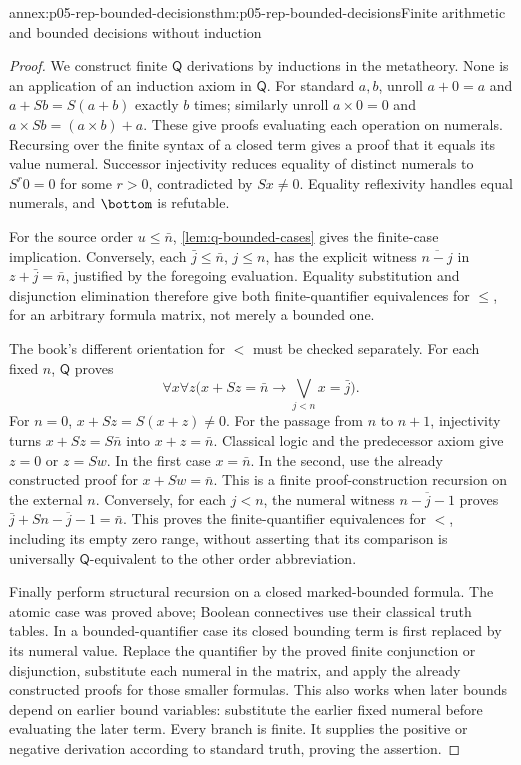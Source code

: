 \begin{annexitem}{annex:p05-rep-bounded-decisions}{thm:p05-rep-bounded-decisions}{Finite arithmetic and bounded decisions without induction}
\begin{proof}
We construct finite \(\mathsf Q\) derivations by inductions in the
metatheory. None is an application of an induction axiom in \(\mathsf Q\).
For standard \(a,b\), unroll \(a+0=a\) and
\(a+Sb=S(a+b)\) exactly \(b\) times; similarly unroll
\(a\times0=0\) and \(a\times Sb=(a\times b)+a\).
These give proofs evaluating each operation on numerals. Recursing over
the finite syntax of a closed term gives a proof that it equals its value
numeral. Successor injectivity reduces equality of distinct numerals to
\(S^r0=0\) for some \(r>0\), contradicted by \(Sx\ne0\).
Equality reflexivity handles equal numerals, and \(\bottom\) is refutable.

For the source order \(u\leq\bar n\),
\cref{lem:q-bounded-cases} gives the finite-case implication. Conversely,
each \(\bar j\leq\bar n\), \(j\leq n\), has the explicit witness
\(\overline{n-j}\) in \(z+\bar j=\bar n\), justified by the foregoing
evaluation. Equality substitution and disjunction elimination therefore
give both finite-quantifier equivalences for \(\leq\), for an arbitrary
formula matrix, not merely a bounded one.

The book's different orientation for \(<\) must be checked separately.
For each fixed \(n\), \(\mathsf Q\) proves
\[
 \forall x\forall z\bigl(x+Sz=\bar n\to
              \bigvee_{j<n}x=\bar j\bigr).
\]
For \(n=0\), \(x+Sz=S(x+z)\ne0\). For the passage from \(n\) to
\(n+1\), injectivity turns \(x+Sz=S\bar n\) into \(x+z=\bar n\).
Classical logic and the predecessor axiom give \(z=0\) or
\(z=Sw\). In the first case \(x=\bar n\). In the second, use the
already constructed proof for \(x+Sw=\bar n\). This is a finite
proof-construction recursion on the external \(n\). Conversely, for
each \(j<n\), the numeral witness \(\overline{n-j-1}\) proves
\(\bar j+S\overline{n-j-1}=\bar n\).
This proves the finite-quantifier equivalences for \(<\), including its
empty zero range, without asserting that its comparison is universally
\(\mathsf Q\)-equivalent to the other order abbreviation.

Finally perform structural recursion on a closed marked-bounded formula.
The atomic case was proved above; Boolean connectives use their classical
truth tables. In a bounded-quantifier case its closed bounding term is
first replaced by its numeral value. Replace the quantifier by the proved
finite conjunction or disjunction, substitute each numeral in the matrix,
and apply the already constructed proofs for those smaller formulas.
This also works when later bounds depend on earlier bound variables:
substitute the earlier fixed numeral before evaluating the later term.
Every branch is finite. It supplies the positive or negative derivation
according to standard truth, proving the assertion.
\end{proof}
\end{annexitem}


